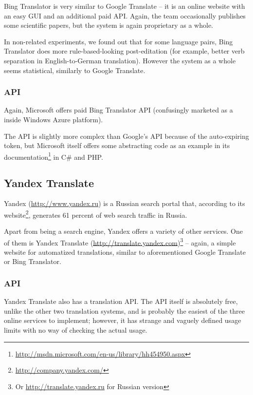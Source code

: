Bing Translator is very similar to Google Translate -- it is an online website with an easy GUI and an additional paid API. Again, the team occasionally publishes some scientific papers, but the system is again  proprietary as a whole.

In non-related experiments, we found out that for some language pairs, Bing Translator does more rule-based-looking post-editation (for example, better verb separation in English-to-German translation). 
However the system as a whole seems statistical, similarly to Google Translate.


\subsubsection{API}
Again, Microsoft offers paid Bing Translator API (confusingly marketed as a  inside Windows Azure platform).

The API is slightly more complex than Google's API because of the auto-expiring token, but Microsoft itself offers some abstracting code as an example in its documentation\footnote{\url{http://msdn.microsoft.com/en-us/library/hh454950.aspx}} in C\# and PHP.


\subsection{Yandex Translate}
\label{yandex}
Yandex (\url{http://www.yandex.ru}) is a Russian search portal that, according to its website\footnote{\url{http://company.yandex.com/}}, generates 61 percent of web search traffic in Russia.

Apart from being a search engine, Yandex offers a variety of other services. One of them is Yandex Translate (\url{http://translate.yandex.com})\footnote{Or \url{http://translate.yandex.ru} for Russian version} -- again, a simple website for automatized translations, similar to aforementioned Google Translate or Bing Translator.


\subsubsection{API}
Yandex Translate also has a translation API. 
The API itself is absolutely free, unlike the other two translation systems, and is probably the easiest of the three online services to implement; however, it has strange and vaguely defined usage limits with no way of checking the actual usage.

